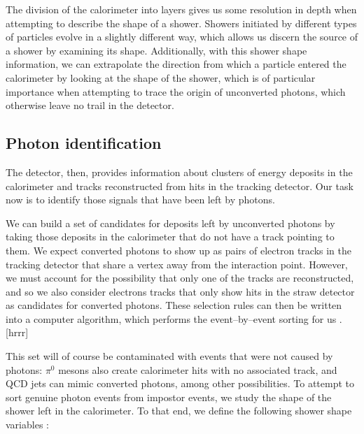 The division of the calorimeter into layers gives us some resolution in depth when attempting to describe the shape of a shower. Showers initiated by different types of particles evolve in a slightly different way, which allows us discern the source of a shower by examining its shape. Additionally, with this shower shape information, we can extrapolate the direction from which a particle entered the calorimeter by looking at the shape of the shower, which is of particular importance when attempting to trace the origin of unconverted photons, which otherwise leave no trail in the detector.

\subsection{Photon identification}
The detector, then, provides information about clusters of energy deposits in the calorimeter and tracks reconstructed from hits in the tracking detector. Our task now is to identify those signals that have been left by photons.

We can build a set of candidates for deposits left by unconverted photons by taking those deposits in the calorimeter that do not have a track pointing to them. We expect converted photons to show up as pairs of electron tracks in the tracking detector that share a vertex away from the interaction point. However, we must account for the possibility that only one of the tracks are reconstructed, and so we also consider electrons tracks that only show hits in the straw detector as candidates for converted photons. These selection rules can then be written into a computer algorithm, which performs the event--by--event sorting for us \cite{phorec}. [hrrr]

This set will of course be contaminated with events that were not caused by photons: $\pi^0$ mesons also create calorimeter hits with no associated track, and QCD jets can mimic converted photons, among other possibilities. To attempt to sort genuine photon events from impostor events, we study the shape of the shower left in the calorimeter. To that end, we define the following shower shape variables \cite{Carminati}:

